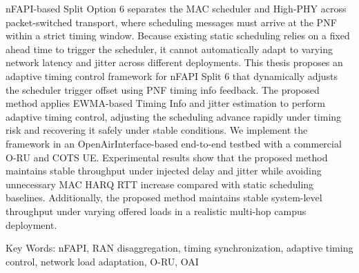 nFAPI-based Split Option 6 separates the MAC scheduler and High-PHY across packet-switched transport, where scheduling messages must arrive at the PNF within a strict timing window. Because existing static scheduling relies on a fixed ahead time to trigger the scheduler, it cannot automatically adapt to varying network latency and jitter across different deployments. This thesis proposes an adaptive timing control framework for nFAPI Split 6 that dynamically adjusts the scheduler trigger offset using PNF timing info feedback. The proposed method applies EWMA-based Timing Info and jitter estimation to perform adaptive timing control, adjusting the scheduling advance rapidly under timing risk and recovering it safely under stable conditions. We implement the framework in an OpenAirInterface-based end-to-end testbed with a commercial O-RU and COTS UE. Experimental results show that the proposed method maintains stable throughput under injected delay and jitter while avoiding unnecessary MAC HARQ RTT increase compared with static scheduling baselines. Additionally, the proposed method maintains stable system-level throughput under varying offered loads in a realistic multi-hop campus deployment.

\noindent Key Words: nFAPI, RAN disaggregation, timing synchronization, adaptive timing control, network load adaptation, O-RU, OAI